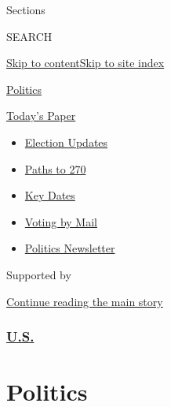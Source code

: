 Sections

SEARCH

\protect\hyperlink{site-content}{Skip to
content}\protect\hyperlink{site-index}{Skip to site index}

\href{https://www.nytimes3xbfgragh.onion/section/politics}{Politics}

\href{https://myaccount.nytimes3xbfgragh.onion/auth/login?response_type=cookie\&client_id=vi}{}

\href{https://www.nytimes3xbfgragh.onion/section/todayspaper}{Today's
Paper}

\begin{itemize}
\item
  \href{https://www.nytimes3xbfgragh.onion/live/2020/09/11/us/trump-vs-biden?action=click\&pgtype=Article\&state=default\&region=TOP_BANNER\&context=storylines_menu}{Election
  Updates}
\item
  \href{https://www.nytimes3xbfgragh.onion/interactive/2020/us/elections/election-states-biden-trump.html?action=click\&pgtype=Article\&state=default\&region=TOP_BANNER\&context=storylines_menu}{Paths
  to 270}
\item
  \href{https://www.nytimes3xbfgragh.onion/interactive/2019/us/elections/2020-presidential-election-calendar.html?action=click\&pgtype=Article\&state=default\&region=TOP_BANNER\&context=storylines_menu}{Key
  Dates}
\item
  \href{https://www.nytimes3xbfgragh.onion/interactive/2020/08/31/us/politics/vote-by-mail-deadlines.html?action=click\&pgtype=Article\&state=default\&region=TOP_BANNER\&context=storylines_menu}{Voting
  by Mail}
\item
  \href{https://www.nytimes3xbfgragh.onion/newsletters/politics?action=click\&pgtype=Article\&state=default\&region=TOP_BANNER\&context=storylines_menu}{Politics
  Newsletter}
\end{itemize}

Supported by

\protect\hyperlink{after-sponsor}{Continue reading the main story}

\hypertarget{us}{%
\subsubsection{\texorpdfstring{\href{/section/us}{U.S.}}{U.S.}}\label{us}}

\hypertarget{politics}{%
\section{Politics}\label{politics}}


